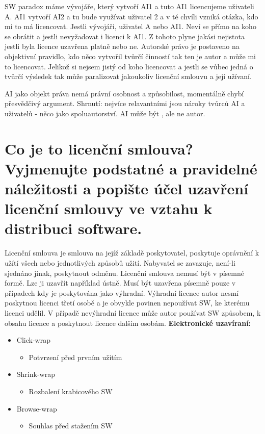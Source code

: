 SW paradox máme vývojáře, který vytvoří AI1 a tuto AI1 licencujeme uživateli A. AI1 vytvoří AI2 a tu bude využívat uživatel 2 a v té chvíli vzniká otázka, kdo mi to má licencovat. Jestli vývojáři, uživatel A nebo AI1. Neví se přímo na koho se obrátit a jestli nevyžadovat i licenci k AI1. Z tohoto plyne jakási nejistota jestli byla licence uzavřena platně nebo ne. Autorské právo je postaveno na objektivní pravidlo, kdo něco vytvořil tvůrčí činností tak ten je autor a může mi to licencovat. Jelikož si nejsem jistý od koho licencovat a jestli se vůbec jedná o tvůrčí výsledek tak může paralizovat jakoukoliv licenční smlouvu a její užívaní.

AI jako objekt práva nemá právní osobnost a způsobilost, momentálně chybí přesvědčivý argument. 
Shrnutí: nejvíce relavantními jsou nároky tvůrců AI a uživatelů - něco jako spoluautorství. AI může být , ale ne autor.

\newpage
\section{Co je to licenční smlouva? Vyjmenujte podstatné a pravidelné náležitosti a popište účel uzavření licenční smlouvy ve vztahu k distribuci software.}

Licenční smlouva je smlouva na jejíž základě poskytovatel, poskytuje oprávnění k užítí všech nebo jednotlivých způsobů užití. Nabyvatel se zavazuje, není-li sjednáno jinak, poskytnout odměnu. 
Licenční smlouva nemusí být v písemné formě. Lze ji uzavřít například ústně. Musí být uzavřena písemně pouze v případech kdy je poskytována jako výhradní. Výhradní licence autor nesmí poskytnou licenci třetí osobě a je obvykle povinen nepoužívat SW, ke kterému licenci udělil. V případě nevýhradní licence může autor používat SW způsobem, k obsahu licence a poskytnout licence dalším osobám. 
\newline
\newline
\textbf{Elektronické uzavíraní:}
\begin{itemize}[noitemsep]
    \item Click-wrap
    \begin{itemize}[noitemsep]
        \item Potvrzení před prvním užitím
    \end{itemize}
    \item Shrink-wrap
    \begin{itemize}[noitemsep]
        \item Rozbalení krabicového SW
    \end{itemize}
    \item Browse-wrap
    \begin{itemize}[noitemsep]
        \item Souhlas před stažením SW
    \end{itemize}
\end{itemize}
  

